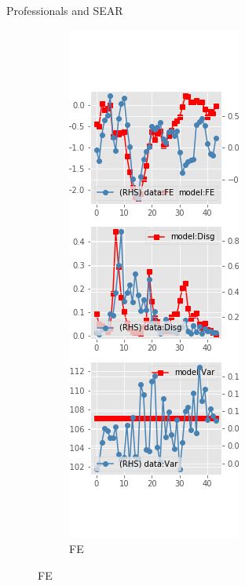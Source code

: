 \documentclass{beamer}
\begin{document}
\begin{frame}{Professionals and SEAR}
	\begin{figure}[ht]
		\label{SE_diag_SPF}
		\begin{subfigure}[b]{0.2\textwidth}
			\centering
			\caption{FE}
			\includegraphics[width=\textwidth, height = 0.8\textheight]{figuresDraft/spf_se_est_diag0.png}

\end{subfigure}
\end{figure}
\end{frame}
\end{document}
